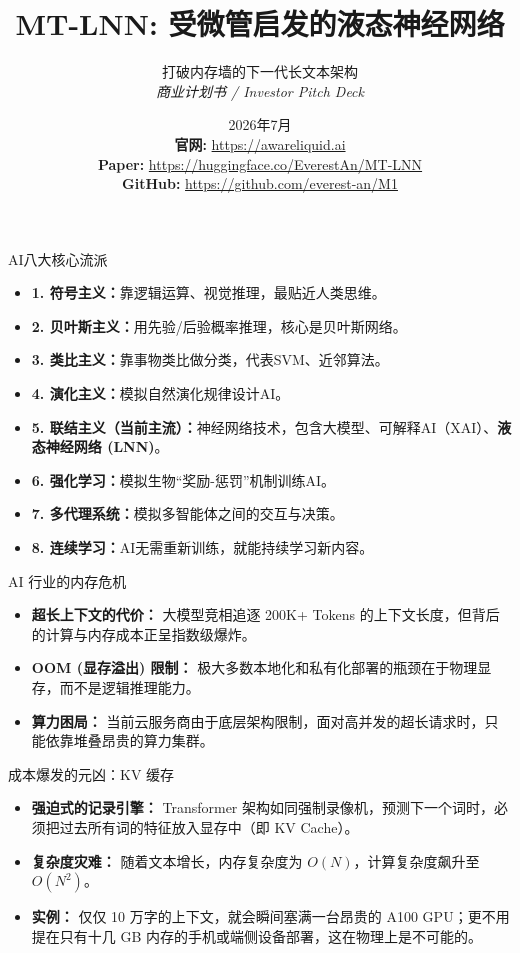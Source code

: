 ﻿\documentclass[aspectratio=169, 10pt]{beamer}
\title{MT-LNN: 受微管启发的液态神经网络}
\subtitle{打破内存墙的下一代长文本架构 \\ \textit{商业计划书 / Investor Pitch Deck}}
\author{\Huge \aeonik{Awareness}}
\date{2026年7月 \\[1em]
\footnotesize
\textbf{官网:} \url{https://awareliquid.ai} \\
\textbf{Paper:} \url{https://huggingface.co/EverestAn/MT-LNN} \\
\textbf{GitHub:} \url{https://github.com/everest-an/M1}
}
\begin{document}
\frame{\titlepage}

\begin{frame}{AI八大核心流派}
\begin{itemize}
    \item \textbf{1. 符号主义：}靠逻辑运算、视觉推理，最贴近人类思维。
    \item \textbf{2. 贝叶斯主义：}用先验/后验概率推理，核心是贝叶斯网络。
    \item \textbf{3. 类比主义：}靠事物类比做分类，代表SVM、近邻算法。
    \item \textbf{4. 演化主义：}模拟自然演化规律设计AI。
    \item \textbf{5. 联结主义（当前主流）：}神经网络技术，包含大模型、可解释AI（XAI）、\textbf{液态神经网络 (LNN)}。
    \item \textbf{6. 强化学习：}模拟生物“奖励-惩罚”机制训练AI。
    \item \textbf{7. 多代理系统：}模拟多智能体之间的交互与决策。
    \item \textbf{8. 连续学习：}AI无需重新训练，就能持续学习新内容。
\end{itemize}
\end{frame}

\begin{frame}{AI 行业的内存危机}
\begin{itemize}
    \item \textbf{超长上下文的代价：} 大模型竞相追逐 200K+ Tokens 的上下文长度，但背后的计算与内存成本正呈指数级爆炸。
    \item \textbf{OOM (显存溢出) 限制：} 极大多数本地化和私有化部署的瓶颈在于物理显存，而不是逻辑推理能力。
    \item \textbf{算力困局：} 当前云服务商由于底层架构限制，面对高并发的超长请求时，只能依靠堆叠昂贵的算力集群。
\end{itemize}
\end{frame}

\begin{frame}{成本爆发的元凶：KV 缓存}
\begin{itemize}
    \item \textbf{强迫式的记录引擎：} Transformer 架构如同强制录像机，预测下一个词时，必须把过去所有词的特征放入显存中（即 KV Cache）。
    \item \textbf{复杂度灾难：} 随着文本增长，内存复杂度为 $O(N)$，计算复杂度飙升至 $O(N^2)$。
    \item \textbf{实例：} 仅仅 10 万字的上下文，就会瞬间塞满一台昂贵的 A100 GPU；更不用提在只有十几 GB 内存的手机或端侧设备部署，这在物理上是不可能的。
\end{itemize}
\end{frame}
\end{document}
